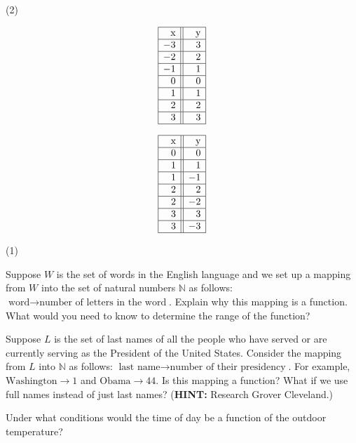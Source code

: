 \begin{tasks}[resume](2)

\task  \label{tablefirst} 

\[\begin{array}{|r||r|}  \hline

$x$  & \hphantom{\text{$-$}} $y$  \\ \hline
 -3 &  3 \\  \hline
 -2 & 2  \\  \hline
  -1 &  1  \\  \hline
 0 &  0 \\  \hline
 1 & 1  \\  \hline
 2 &  2 \\  \hline
 3 & 3  \\  \hline

\end{array}\]

\task \label{tablelast}

\[\begin{array}{|r||r|}  \hline

\hphantom{\text{$-$}} $x$  &$y$  \\ \hline

 0 & 0 \\  \hline
 1 & 1  \\  \hline
 1 & -1  \\  \hline
 2 &  2 \\  \hline
 2 & -2  \\  \hline
 3 &  3 \\  \hline
 3 & -3  \\  \hline

\end{array}\]

\end{tasks}

\begin{tasks}[resume](1)

\task    Suppose $W$ is the set of words in the English language and we set up a mapping from $W$ into the set of natural numbers $\mathbb{N}$ as follows: $\text{word} \rightarrow \text{number of letters in the word}$.  Explain why this mapping is a function.  What would you need to know to determine the range of the function?

\task  Suppose $L$ is the set of last names of all the people who have served or are currently serving as the President of the United States.   Consider the mapping from $L$ into $\mathbb{N}$ as follows:  $\text{last name} \rightarrow \text{number of their presidency}$.  For example,  $\text{Washington} \rightarrow 1$ and $\text{Obama} \rightarrow 44$.  Is this mapping a function?  What if we use full names instead of just last names? (\textbf{HINT:}  Research Grover Cleveland.)

\task  Under what conditions would the time of day be a function of the outdoor temperature?

\end{tasks}


